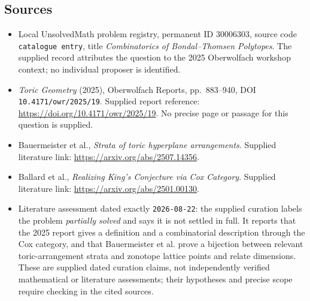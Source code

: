 \documentclass[11pt]{article}
\begin{document}
\subsection{Sources}
\begin{itemize}
\item Local UnsolvedMath problem registry, permanent ID \(30006303\), source code \texttt{catalogue entry}, title \emph{Combinatorics of Bondal--Thomsen Polytopes}. The supplied record attributes the question to the 2025 Oberwolfach workshop context; no individual proposer is identified.
\item \emph{Toric Geometry} (2025), Oberwolfach Reports, pp.\ 883--940, DOI \texttt{10.4171/owr/2025/19}. Supplied report reference: \url{https://doi.org/10.4171/owr/2025/19}. No precise page or passage for this question is supplied.
\item Bauermeister et al., \emph{Strata of toric hyperplane arrangements}. Supplied literature link: \url{https://arxiv.org/abs/2507.14356}.
\item Ballard et al., \emph{Realizing King's Conjecture via Cox Category}. Supplied literature link: \url{https://arxiv.org/abs/2501.00130}.
\item Literature assessment dated exactly \texttt{2026-08-22}: the supplied curation labels the problem \emph{partially solved} and says it is not settled in full. It reports that the 2025 report gives a definition and a combinatorial description through the Cox category, and that Bauermeister et al. prove a bijection between relevant toric-arrangement strata and zonotope lattice points and relate dimensions. These are supplied dated curation claims, not independently verified mathematical or literature assessments; their hypotheses and precise scope require checking in the cited sources.
\end{itemize}
\end{document}
